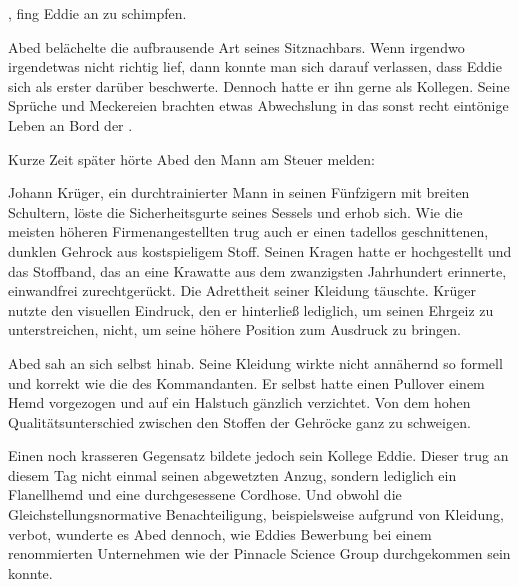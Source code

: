 \par

, fing Eddie an zu schimpfen. 

\par

Abed belächelte die aufbrausende Art seines Sitznachbars. Wenn irgendwo irgendetwas nicht richtig lief, dann konnte man sich darauf verlassen, dass Eddie sich als erster darüber beschwerte. Dennoch hatte er ihn gerne als Kollegen. Seine Sprüche und Meckereien brachten etwas Abwechslung in das sonst recht eintönige Leben an Bord der .

\par

Kurze Zeit später hörte Abed den Mann am Steuer melden: 

\par

Johann Krüger, ein durchtrainierter Mann in seinen Fünfzigern mit breiten Schultern, löste die Sicherheitsgurte seines Sessels und erhob sich. Wie die meisten höheren Firmenangestellten trug auch er einen tadellos geschnittenen, dunklen Gehrock aus kostspieligem Stoff. Seinen Kragen hatte er hochgestellt und das Stoffband, das an eine Krawatte aus dem zwanzigsten Jahrhundert erinnerte, einwandfrei zurechtgerückt. Die Adrettheit seiner Kleidung täuschte. Krüger nutzte den visuellen Eindruck, den er hinterließ lediglich, um seinen Ehrgeiz zu unterstreichen, nicht, um seine höhere Position zum Ausdruck zu bringen.

\par

Abed sah an sich selbst hinab. Seine Kleidung wirkte nicht annähernd so formell und korrekt wie die des Kommandanten. Er selbst hatte einen Pullover einem Hemd vorgezogen und auf ein Halstuch gänzlich verzichtet. Von dem hohen Qualitätsunterschied zwischen den Stoffen der Gehröcke ganz zu schweigen.

\par

Einen noch krasseren Gegensatz bildete jedoch sein Kollege Eddie. Dieser trug an diesem Tag nicht einmal seinen abgewetzten Anzug, sondern lediglich ein Flanellhemd und eine durchgesessene Cordhose. Und obwohl die Gleichstellungsnormative Benachteiligung, beispielsweise aufgrund von Kleidung, verbot, wunderte es Abed dennoch, wie Eddies Bewerbung bei einem renommierten Unternehmen wie der Pinnacle Science Group durchgekommen sein konnte.

